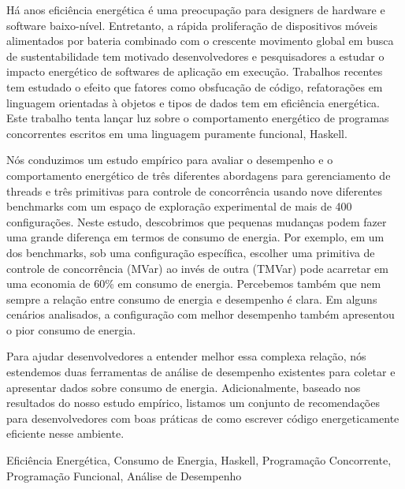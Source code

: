 Há anos eficiência energética é uma preocupação para designers de hardware e software baixo-nível. Entretanto, a rápida proliferação de dispositivos móveis alimentados por bateria combinado com o crescente movimento global em busca de sustentabilidade tem motivado desenvolvedores e pesquisadores a estudar o impacto energético de softwares de aplicação em execução. Trabalhos recentes tem estudado o efeito que fatores como obsfucação de código, refatorações em linguagem orientadas à objetos e tipos de dados tem em eficiência energética. Este trabalho tenta lançar luz sobre o comportamento energético de programas concorrentes escritos em uma linguagem puramente funcional, Haskell.

Nós conduzimos um estudo empírico para avaliar o desempenho e o comportamento energético de três diferentes abordagens para gerenciamento de threads e três primitivas para controle de concorrência usando nove diferentes benchmarks com um espaço de exploração experimental de mais de 400 configurações. Neste estudo, descobrimos que pequenas mudanças podem fazer uma grande diferença em termos de consumo de energia. Por exemplo, em um dos benchmarks, sob uma configuração específica, escolher uma primitiva de controle de concorrência (MVar) ao invés de outra (TMVar) pode acarretar em uma economia de 60\% em consumo de energia. Percebemos também que nem sempre a relação entre consumo de energia e desempenho é clara. Em alguns cenários analisados, a configuração com melhor desempenho também apresentou o pior consumo de energia.

Para ajudar desenvolvedores a entender melhor essa complexa relação, nós estendemos duas ferramentas de análise de desempenho existentes para coletar e apresentar dados sobre consumo de energia. Adicionalmente, baseado nos resultados do nosso estudo empírico, listamos um conjunto de recomendações para desenvolvedores com boas práticas de como escrever código energeticamente eficiente nesse ambiente.

\begin{keywords}
Eficiência Energética, Consumo de Energia, Haskell, Programação Concorrente, Programação Funcional, Análise de Desempenho
\end{keywords}

